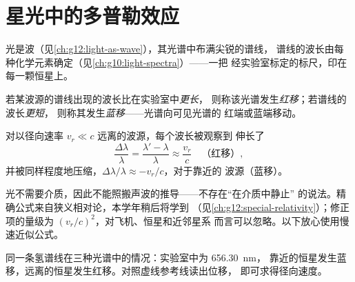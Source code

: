 \section{星光中的多普勒效应}

光是波（见\cref{ch:g12:light-as-wave}），其光谱中布满尖锐的谱线，
谱线的波长由每种化学元素确定（见\cref{ch:g10:light-spectra}）——一把
经实验室标定的标尺，印在每一颗恒星上。

\begin{definition}[红移与蓝移]\label{def:g12:doppler-effect:redshift}
若某波源的谱线出现的波长比在实验室中\emph{更长}，
则称该光谱发生\emph{红移}；若谱线的波长\emph{更短}，
则称其发生\emph{蓝移}——光谱向可见光谱的
红端或蓝端移动。
\end{definition}

\begin{proposition}[光的多普勒效应]\label{prop:g12:doppler-effect:light}
对以径向速率 $v_r \ll c$ 远离的波源，每个波长被观察到
伸长了
\[ \frac{\Delta \lambda}{\lambda} = \frac{\lambda' - \lambda}{\lambda} \approx \frac{v_r}{c} \quad \text{（红移）}, \]
并被同样程度地压缩，$\Delta\lambda/\lambda \approx -v_r/c$，对于靠近的
波源（蓝移）。
\end{proposition}
\admitted

\begin{remark}[准确公式的来源]\label{rem:g12:doppler-effect:honest}
光不需要介质，因此不能照搬声波的推导——不存在“在介质中静止”
的说法。精确公式来自狭义相对论，本学年稍后将学到
（见\cref{ch:g12:special-relativity}）；修正项的量级为 $(v_r/c)^2$，对飞机、恒星和近邻星系
而言可以忽略。以下放心使用慢速近似公式。
\end{remark}

\begin{omfigure}

{\small 同一条氢谱线在三种光谱中的情况：实验室中为 \qty{656.30}{nm}，
靠近的恒星发生蓝移，远离的恒星发生红移。对照虚线参考线读出位移，
即可求得径向速度。}
\end{omfigure}

